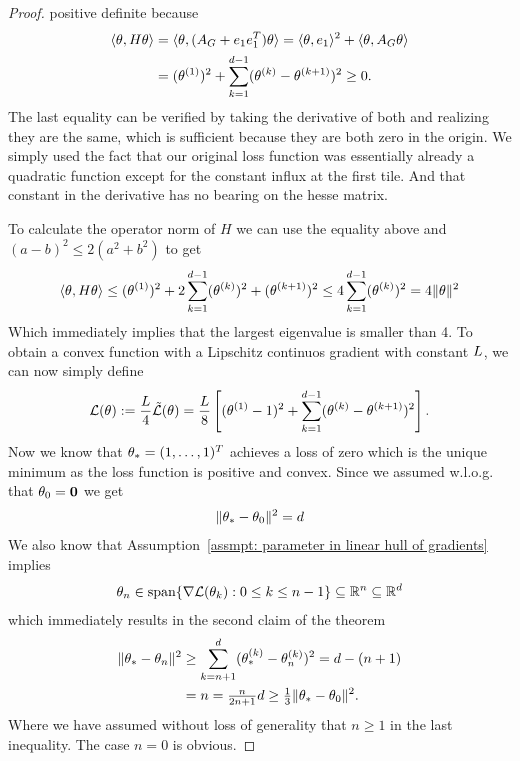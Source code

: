 \begin{proof}
	positive definite because
	\begin{align*}
		\langle \theta , H \theta\rangle
		&= \langle \theta, (A_G + e_1 e_1^T) \theta \rangle
		= \langle \theta, e_1\rangle^2
		+ \langle \theta, A_G \theta\rangle
		\\
		&= (\theta^{(1)})^2
		+ \sum_{k=1}^{d-1}(\theta^{(k)}-\theta^{(k+1)})^2
		\ge 0.
	\end{align*}
	The last equality can be verified by taking the derivative of both and
	realizing they are the same, which is sufficient because they are both zero	
	in the origin. We simply used the fact that our original loss function
	was essentially already a quadratic function except for the constant influx
	at the first tile. And that constant in the derivative has no bearing on the
	hesse matrix.


	To calculate the operator norm of \(H\) we can use the equality above and	
	\((a-b)^2 \le 2(a^2 + b^2)\) to get
	\begin{align*}
		\langle \theta, H\theta\rangle
		\le (\theta^{(1)})^2 + 2\sum_{k=1}^{d-1}(\theta^{(k)})^2 + (\theta^{(k+1)})^2 
		\le 4 \sum_{k=1}^{d-1} (\theta^{(k)})^2
		= 4 \|\theta\|^2
	\end{align*}
	Which immediately implies that the largest eigenvalue is smaller than 4. To
	obtain a convex function with a Lipschitz continuos gradient with constant
	\(L\), we can now simply define
	\begin{align*}
		\mathcal{L}(\theta):= \frac{L}{4}\tilde{\mathcal{L}}(\theta)
		= \frac{L}{8}\left[
			(\theta^{(1)}-1)^2
			+ \sum_{k=1}^{d-1} (\theta^{(k)}-\theta^{(k+1)})^2
		\right].
	\end{align*}
	Now we know that \(\theta_* = (1,\dots,1)^T\) achieves a loss of zero which is
	the unique minimum as the loss function is positive and convex. Since we
	assumed w.l.o.g. that \(\theta_0=\mathbf{0}\) we get
	\begin{align}\label{eq: initial distance}
		\|\theta_* - \theta_0\|^2 = d
	\end{align}
	We also know
	that Assumption~\ref{assmpt: parameter in linear hull of gradients} implies
	\begin{align*}
		\theta_n \in \text{span}\{\nabla\mathcal{L}(\theta_k): 0 \le k \le n-1\}
		\subseteq \mathbb{R}^n \subseteq \mathbb{R}^d
	\end{align*}
	which immediately results in the second claim of the theorem
	\begin{align*}
		\|\theta_* - \theta_n\|^2
		&\ge \sum_{k=n+1}^d (\theta_*^{(k)}- \theta_n^{(k)})^2
		= d-(n+1) \\
		&= n = \tfrac{n}{2n+1} d
		\ge \tfrac13 \|\theta_* - \theta_0\|^2. 
	\end{align*}
	Where we have assumed without loss of generality that \(n\ge1\) in the last
	inequality. The case \(n=0\) is obvious.


\end{proof}
